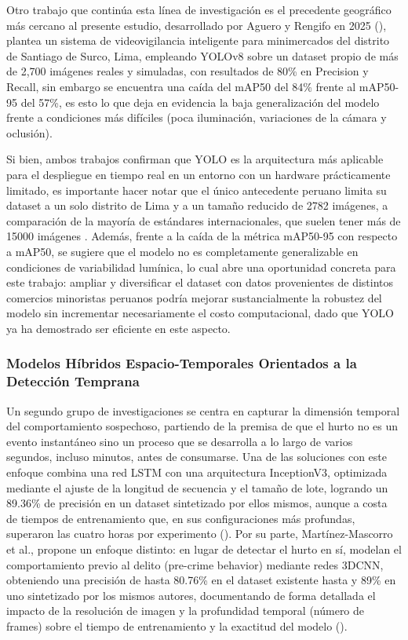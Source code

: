     Otro trabajo que continúa esta línea de investigación es el precedente geográfico más cercano al presente estudio, desarrollado por Aguero y Rengifo en 2025 (\cite{aguero_intelligent_2025}), plantea un sistema de
    videovigilancia inteligente para minimercados del distrito de Santiago de Surco, Lima, empleando YOLOv8 sobre un dataset propio de más de 2,700
    imágenes reales y simuladas, con resultados de 80\% en Precision y Recall, sin embargo se encuentra una caída del mAP50 del 84\% frente al mAP50-95 del 57\%, es esto lo que deja en evidencia la baja generalización del modelo frente a condiciones más difíciles (poca iluminación, variaciones de la cámara y oclusión).
    
    Si bien, ambos trabajos confirman que YOLO es la arquitectura más aplicable para el despliegue en tiempo real en un entorno con un hardware prácticamente limitado, es importante hacer notar que el único antecedente peruano \cite{aguero_intelligent_2025} limita su dataset a un solo distrito de Lima y a un tamaño reducido de 2782 imágenes, a comparación de la mayoría de estándares internacionales, que suelen tener más de 15000 imágenes \cite{hameed_real_2025}. Además, frente a la caída de la métrica mAP50-95 con respecto a mAP50, se sugiere que el modelo no es completamente generalizable en condiciones de variabilidad lumínica, lo cual abre una oportunidad concreta para este trabajo: ampliar y diversificar el dataset con datos provenientes de distintos comercios minoristas peruanos podría mejorar sustancialmente la robustez del modelo sin incrementar necesariamente el costo computacional, dado que YOLO ya ha demostrado ser eficiente en este aspecto.
		
	\subsubsection{Modelos Híbridos Espacio-Temporales Orientados a la Detección Temprana}
  
    Un segundo grupo de investigaciones se centra en capturar la dimensión temporal del comportamiento sospechoso, partiendo de la premisa de que
    el hurto no es un evento instantáneo sino un proceso que se desarrolla a lo largo de varios segundos, incluso minutos, antes de consumarse.
    Una de las soluciones con este enfoque combina una red LSTM con una arquitectura InceptionV3, optimizada mediante el
    ajuste de la longitud de secuencia y el tamaño de lote, logrando un 89.36\% de precisión en un dataset sintetizado por ellos mismos, aunque a costa de
    tiempos de entrenamiento que, en sus configuraciones más profundas, superaron las cuatro horas por experimento (\cite{ansari_optimized_2023}). Por su parte,
    Martínez-Mascorro et al., propone un enfoque distinto: en lugar de detectar el hurto en sí, modelan el comportamiento previo
    al delito (pre-crime behavior) mediante redes 3DCNN, obteniendo una precisión de hasta 80.76\% en el dataset existente hasta y 89\% en
    uno sintetizado por los mismos autores, documentando de forma detallada el impacto de la resolución de imagen y la profundidad
    temporal (número de frames) sobre el tiempo de entrenamiento y la exactitud del modelo (\cite{martinez-mascorro_suspicious_2021}).
    
